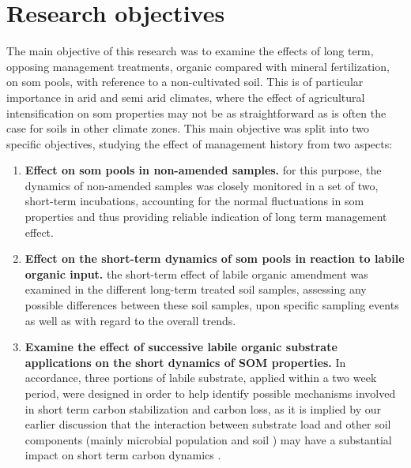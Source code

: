 \section{Research objectives}

	The main objective of this research was to examine the effects of long term, opposing management treatments, organic compared with mineral fertilization, on \gls{som} pools,  with reference to a non-cultivated soil. This is of particular importance in arid and semi arid climates, where the effect of agricultural intensification on \gls{som} properties may not be as straightforward as is often the case for soils in other climate zones.
	This main objective was split into two specific objectives, studying the effect of management history from two aspects:
	\begin{enumerate}
		\item \textbf{Effect on \gls{som} pools in non-amended samples.} for this purpose, the dynamics of non-amended samples was closely monitored in a set of two, short-term incubations, accounting for the normal fluctuations in \gls{som} properties and thus providing reliable indication of long term management effect.
		\item \textbf{Effect on the short-term dynamics of \gls{som} pools in reaction to labile organic input.} the short-term effect of labile organic amendment was examined in the different long-term treated soil samples, assessing any possible differences between these soil samples, upon specific sampling events as well as with regard to the overall trends.


		\item \textbf{Examine the effect of successive labile organic substrate applications on the short dynamics of SOM properties.} In accordance, three portions of labile substrate, applied within a two week period, were designed in  order to help identify possible mechanisms involved in short term carbon stabilization and carbon loss, as it is implied by our earlier discussion that the interaction between substrate load and other soil components (mainly microbial population and soil
		) may have a substantial impact on short term carbon dynamics .
	\end{enumerate}
